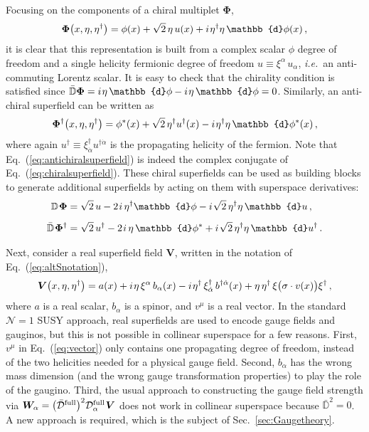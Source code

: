 \documentclass[12pt,document,nofootinbib,superscriptaddress,onecolumn,preprintnumbers,balancelastpage]{article}
\newcommand{\s}{\hspace{0.8pt}}
\newcommand{\PP}{\mathbb{d}}
\DeclareRobustCommand{\Sec}[1]{Sec.~\ref{#1}}
\DeclareRobustCommand{\Eq}[1]{Eq.~(\ref{#1})}
\newcommand{\D}{\mathbb{D}}
\newcommand{\bPhi}{\boldsymbol{\Phi}}
\newcommand{\bV}{\boldsymbol{V}}
\begin{document}
\begin{spacing}{1.2}
Focusing on the components of a chiral multiplet $\boldsymbol{\Phi}$,  
%
\begin{align}
\label{eq:chiralsuperfield}
\boldsymbol{\Phi}\big(x,\eta,\eta^\dagger\big) = \phi(x) + \sqrt{2} \, \eta \, u(x) + i \s \eta^\dagger \eta \, \PP \phi(x) \,,
\end{align}
%
it is clear that this representation is built from a complex scalar $\phi$ degree of freedom and a single helicity fermionic degree of freedom $u \equiv \xi^\alpha \,u_\alpha$, \emph{i.e.}\ an anti-commuting Lorentz scalar.
%
It is easy to check that the chirality condition is satisfied since $\bar{\D} \boldsymbol{\Phi} = i\s \eta \, \PP \phi - i\s \eta \, \PP \phi = 0$.
%
Similarly, an anti-chiral superfield can be written as
\begin{align}
\label{eq:antichiralsuperfield}
\bPhi^\dagger\big(x,\eta,\eta^\dagger\big) = \phi^*(x) + \sqrt{2} \, \eta^\dagger u^\dagger (x) - i \s\eta^\dagger \eta \, \PP \phi^*(x)  \, ,
\end{align}
where again $u^\dagger \equiv \xi^\dagger_{\dot{\alpha}} u^{\dagger \dot{\alpha}}$ is the propagating helicity of the fermion. 
%
Note that \Eq{eq:antichiralsuperfield} is indeed the complex conjugate of \Eq{eq:chiralsuperfield}.
%
These chiral superfields can be used as building blocks to generate additional superfields by acting on them with superspace derivatives:
\begin{align}
\label{eq:DPhicomponents}
\D\s \bPhi  &= \sqrt{2} \, u - 2 \s i\, \eta^\dagger \PP \phi - i\s \sqrt{2} \, \eta^\dagger \eta \, \PP u \,, \notag\\[5pt]
\bar{\D} \s\bPhi^\dagger  &=  \sqrt{2} \, u^\dagger - 2\s i\, \eta \, \PP \phi^* + i\s \sqrt{2} \, \eta^\dagger  \eta \, \PP u^\dagger \,.
\end{align}

Next, consider a real superfield field $\boldsymbol{V}$, written in the notation of \Eq{eq:altSnotation},
\begin{align}
\label{eq:vector}
\bV\big(x,\eta,\eta^\dagger\big) = a(x) + i\s \eta \, \xi^\alpha\, b_\alpha(x) - i\s \eta^\dagger\, \xi^\dagger_{\dot{\alpha}} \,b^{\dagger \dot{\alpha}}(x) + \eta\, \eta^\dagger \, \xi \big(\sigma \cdot v(x)\big) \xi^\dagger \, ,
\end{align}
where $a$ is a real scalar, $b_\alpha$ is a spinor, and $v^\mu$ is a real vector.
%
In the standard $\mathcal{N} = 1$ SUSY approach, real superfields are used to encode gauge fields and gauginos, but this is not possible in collinear superspace for a few reasons.
%
First, $v^\mu$ in \Eq{eq:vector} only contains one propagating degree of freedom, instead of the two helicities needed for a physical gauge field.
%
Second, $b_\alpha$ has the wrong mass dimension (and the wrong gauge transformation properties) to play the role of the gaugino.
%
Third, the usual approach to constructing the gauge field strength via $\boldsymbol{W}_\alpha = \big(\bar{\mathcal{D}}^\text{full}\big)^2 \mathcal{D}_\alpha^\text{full}\s \boldsymbol{V}$ does not work in collinear superspace because $\bar{\D}^2 = 0$.
%
A new approach is required, which is the subject of \Sec{sec:Gaugetheory}.


\end{spacing}
\end{document}
